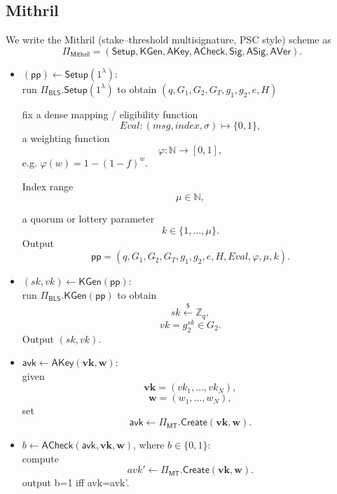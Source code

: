 \documentclass{article}
\begin{document}
\subsection{Mithril}

We write the Mithril (stake–threshold multisignature, PSC style) scheme as
\[
  \Pi_{\mathsf{Mithril}}
  =
  (\mathsf{Setup}, \mathsf{KGen}, \mathsf{AKey}, \mathsf{ACheck}, \mathsf{Sig}, \mathsf{ASig}, \mathsf{AVer}).
\]

\begin{itemize}

  \item $(\mathsf{pp}) \leftarrow \mathsf{Setup}(1^\lambda)$:\\
        run $\Pi_{\mathsf{BLS}}.\mathsf{Setup}(1^\lambda)$ to obtain $(q,G_1,G_2,G_T,g_1,g_2,e,H)$
        
        fix a dense mapping / eligibility function
        \[
        Eval : ( msg, index, \sigma) \mapsto \{0,1\},
        \]
        a weighting function
        \[
          \varphi : \mathbb{N} \to [0,1],
        \]
        e.g. $\varphi(w) = 1-(1-f)^w$.

        Index range
        \[
          \mu \in \mathbb{N}, 
        \]

        a quorum or lottery parameter
        \[
          k \in \{1,\dots,\mu\}.
        \]
        Output
        \[
          \mathsf{pp}=(q,G_1,G_2,G_T,g_1,g_2,e,H,Eval,\varphi,\mu,k).
        \]

  \item $(sk,vk) \leftarrow \mathsf{KGen}(\mathsf{pp})$:\\
        run $\Pi_{\mathsf{BLS}}.\mathsf{KGen}(\mathsf{pp})$ to obtain
        \[
          sk \xleftarrow{\$} \mathbb{Z}_q,
        \]
        \[
          vk = g_2^{sk} \in G_2.
        \]
        Output $(sk,vk)$.

  \item $\mathsf{avk} \leftarrow \mathsf{AKey}(\mathbf{vk},\mathbf{w})$:\\
        given
        \[
          \mathbf{vk}=(vk_1,\dots,vk_N),
        \]
        \[
          \mathbf{w}=(w_1,\dots,w_N),
        \]
        set
        \[
          \mathsf{avk} \leftarrow \Pi_{\mathsf{MT}}.\mathsf{Create}(\mathbf{vk},\mathbf{w}).
        \]

  \item $b \leftarrow \mathsf{ACheck}(\mathsf{avk},\mathbf{vk},\mathbf{w})$, where $b\in\{0,1\}$:\\
        compute
        \[
          avk' \leftarrow \Pi_{\mathsf{MT}}.\mathsf{Create}(\mathbf{vk},\mathbf{w}).
        \]
        output b=1 iff avk=avk'. 


\end{itemize}
\end{document}
